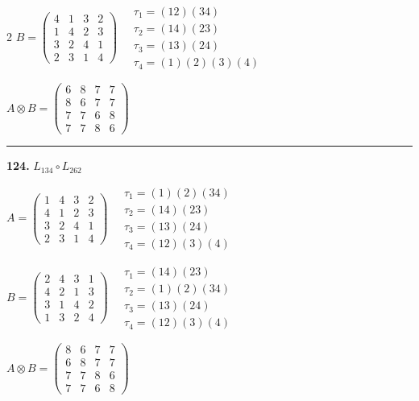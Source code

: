 \begin{multicols}{2}
$B = \begin{pmatrix} 4 & 1 & 3 & 2 \\ 1 & 4 & 2 & 3 \\ 3 & 2 & 4 & 1 \\ 2 & 3 & 1 & 4 \end{pmatrix} \quad \begin{matrix} \tau_{1}=(1 2)(3 4) \\ \tau_{2}=(1 4)(2 3) \\ \tau_{3}=(1 3)(2 4) \\ \tau_{4}=(1)(2)(3)(4) \end{matrix}$

$A \otimes B = \begin{pmatrix} 6 & 8 & 7 & 7 \\ 8 & 6 & 7 & 7 \\ 7 & 7 & 6 & 8 \\ 7 & 7 & 8 & 6 \end{pmatrix}$

\vspace{0.3em}
\hrule
\vspace{0.3em}

\noindent\textbf{124.} $L_{134} \circ L_{262}$

$A = \begin{pmatrix} 1 & 4 & 3 & 2 \\ 4 & 1 & 2 & 3 \\ 3 & 2 & 4 & 1 \\ 2 & 3 & 1 & 4 \end{pmatrix} \quad \begin{matrix} \tau_{1}=(1)(2)(3 4) \\ \tau_{2}=(1 4)(2 3) \\ \tau_{3}=(1 3)(2 4) \\ \tau_{4}=(1 2)(3)(4) \end{matrix}$

$B = \begin{pmatrix} 2 & 4 & 3 & 1 \\ 4 & 2 & 1 & 3 \\ 3 & 1 & 4 & 2 \\ 1 & 3 & 2 & 4 \end{pmatrix} \quad \begin{matrix} \tau_{1}=(1 4)(2 3) \\ \tau_{2}=(1)(2)(3 4) \\ \tau_{3}=(1 3)(2 4) \\ \tau_{4}=(1 2)(3)(4) \end{matrix}$

$A \otimes B = \begin{pmatrix} 8 & 6 & 7 & 7 \\ 6 & 8 & 7 & 7 \\ 7 & 7 & 8 & 6 \\ 7 & 7 & 6 & 8 \end{pmatrix}$


\end{multicols}
